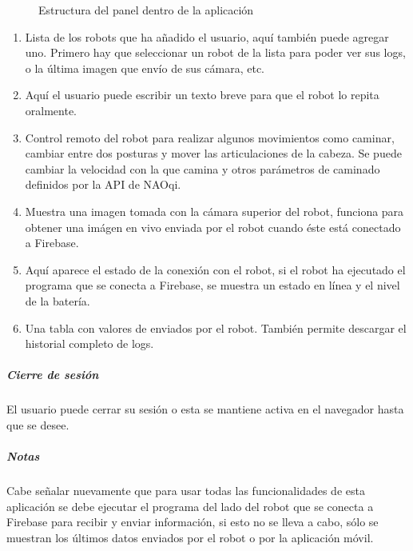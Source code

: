 \begin{figure}[htbp]
\centering
\capstart

\noindent{}
\caption{Estructura del panel dentro de la aplicación}\label{\detokenize{users_docs:webappstruct}}\end{figure}
\begin{enumerate}
\item {} 
Lista de los robots que ha añadido el usuario, aquí también puede agregar uno. Primero hay que seleccionar un robot de la lista para poder ver sus logs, o la última imagen que envío de sus cámara, etc.

\item {} 
Aquí el usuario puede escribir un texto breve para que el robot lo repita oralmente.

\item {} 
Control remoto del robot para realizar algunos movimientos como caminar, cambiar entre dos posturas y mover las articulaciones de la cabeza. Se puede cambiar la velocidad con la que camina y otros parámetros de caminado definidos por la API de NAOqi.

\item {} 
Muestra una imagen tomada con la cámara superior del robot, funciona para obtener una imágen en vivo enviada por el robot cuando éste está conectado a Firebase.

\item {} 
Aquí aparece el estado de la conexión con el robot, si el robot ha ejecutado el programa que se conecta a Firebase, se muestra un estado en línea y el nivel de la batería.

\item {} 
Una tabla con valores de  enviados por el robot. También permite descargar el historial completo de logs.

\end{enumerate}


\subparagraph{Cierre de sesión}
\label{\detokenize{users_docs:cierre-de-sesion}}
El usuario puede cerrar su sesión o esta se mantiene activa en el navegador
hasta que se desee.


\subparagraph{Notas}
\label{\detokenize{users_docs:notas}}
Cabe señalar nuevamente que para usar todas las funcionalidades de esta
aplicación se debe ejecutar el programa del lado del robot que se conecta a
Firebase para recibir y enviar información, si esto no se lleva a cabo, sólo
se muestran los últimos datos enviados por el robot o por la aplicación móvil.

